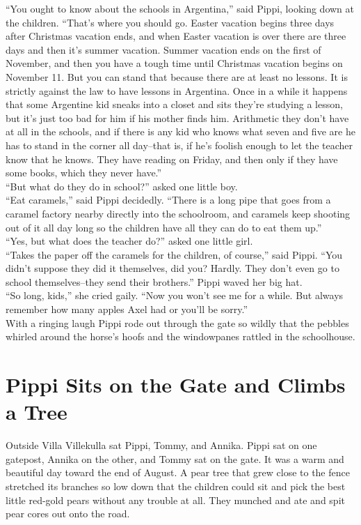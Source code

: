 \documentclass{standard}
\begin{document}
“You ought to know about the schools in Argentina,” said Pippi, looking down at the children. “That’s where you should go. Easter vacation begins three days after Christmas vacation ends, and when Easter vacation is over there are three days and then it’s summer vacation. Summer vacation ends on the first of November, and then you have a tough time until Christmas vacation begins on November 11. But you can stand that because there are at least no lessons. It is strictly against the law to have lessons in Argentina. Once in a while it happens that some Argentine kid sneaks into a closet and sits they’re studying a lesson, but it’s just too bad for him if his mother finds him. Arithmetic they don’t have at all in the schools, and if there is any kid who knows what seven and five are he has to stand in the corner all day--that is, if he’s foolish enough to let the teacher know that he knows. They have reading on Friday, and then only if they have some books, which they never have.”\\

“But what do they do in school?” asked one little boy.\\

“Eat caramels,” said Pippi decidedly. “There is a long pipe that goes from a caramel factory nearby directly into the schoolroom, and caramels keep shooting out of it all day long so the children have all they can do to eat them up.”\\

“Yes, but what does the teacher do?” asked one little girl.\\

“Takes the paper off the caramels for the children, of course,” said Pippi. “You didn’t suppose they did it themselves, did you? Hardly. They don’t even go to school themselves--they send their brothers.” Pippi waved her big hat.\\

“So long, kids,” she cried gaily. “Now you won’t see me for a while. But always remember how many apples Axel had or you’ll be sorry.”\\

With a ringing laugh Pippi rode out through the gate so wildly that the pebbles whirled around the horse’s hoofs and the windowpanes rattled in the schoolhouse.
\newpage


\section{Pippi Sits on the Gate and Climbs a Tree}
Outside Villa Villekulla sat Pippi, Tommy, and Annika. Pippi sat on one gatepost, Annika on the other, and Tommy sat on the gate. It was a warm and beautiful day toward the end of August. A pear tree that grew close to the fence stretched its branches so low down that the children could sit and pick the best little red-gold pears without any trouble at all. They munched and ate and spit pear cores out onto the road.\\
\end{document}
